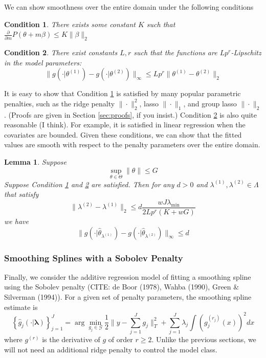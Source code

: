 \documentclass[12pt]{article}
\newtheorem{lemma}{Lemma}
\newtheorem{condition}{Condition}
\begin{document}
We can show smoothness over the entire domain under the following conditions
\begin{condition}
\label{condn:param1}
There exists some constant $K$ such that 
$\frac{\partial}{\partial m}P(\theta + m \beta) \le K \|\beta\|_{2}$
\end{condition}
\begin{condition}
\label{condn:param2}
There exist constants $L, r$ such that the functions are $Lp^r$-Lipschitz in the model parameters: 
\begin{equation}
\|g(\cdot|\theta^{(1)})-g(\cdot|\theta^{(2)})\|_{\infty}\le Lp^{r}\|\theta^{(1)}-\theta^{(2)}\|_{2}
\end{equation}
\end{condition}

It is easy to show that Condition \ref{condn:param1} is satisfied by many popular parametric penalties, such as the ridge penalty $\| \cdot \|_2^2$, lasso $\| \cdot \|_1$, and group lasso $\| \cdot \|_2$. (Proofs are given in Section \ref{sec:proofs}, if you insist.) Condition \ref{condn:param2} is also quite reasonable (I think). For example, it is satisfied in linear regression when the covariates are bounded. Given these conditions, we can show that the fitted values are smooth with respect to the penalty parameters over the entire domain.

\begin{lemma}
\label{lemma:parametric}
Suppose 
\[
\sup_{\theta\in\Theta}\|\theta\|\le G
\]
Suppose Condition \ref{condn:param1} and \ref{condn:param2} are satisfied.
Then for any $d>0$ and $\lambda^{(1)}, \lambda^{(2)} \in \Lambda$ that satisfy
\[
\|\lambda^{(2)}-\lambda^{(1)}\|_{2}\le d\frac{wJ\lambda_{\min}}{2Lp^{r}\left(K+wG\right)}
\]
we have
\[
\|g(\cdot|\hat{\theta}_{\lambda^{(1)}})-g(\cdot|\hat{\theta}_{\lambda^{(2)}})\|_{\infty}\le d
\]
\end{lemma}

\subsubsection{Smoothing Splines with a Sobolev Penalty}

Finally, we consider the additive regression model of fitting a smoothing spline using the Sobolev penalty (CITE: de Boor (1978), Wahba (1990), Green \& Silverman (1994)). For a given set of penalty parameters, the smoothing spline estimate is
\begin{equation}
\left \{ \hat{g}_j(\cdot | \boldsymbol \lambda) \right \}_{j=1}^J =\arg\min_{g_j\in\mathcal{G}}\frac{1}{2}\|y- \sum_{j=1}^J g_j\|_{T}^{2}+ \sum_{j=1}^J \lambda_j \int (g_j^{(r_j)}(x))^2 dx
\end{equation}
where $g^{(r)}$ is the derivative of $g$ of order $r \ge 2$. Unlike the previous sections, we will not need an additional ridge penalty to control the model class.
\end{document}
